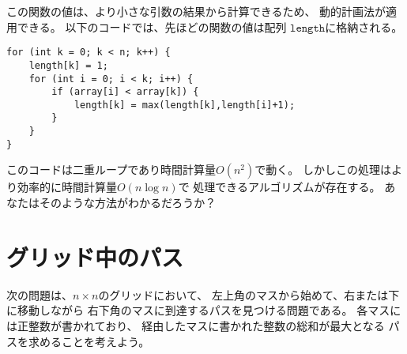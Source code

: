 \begin{comment}
Since all values of the function can be calculated
from its smaller values,
we can use dynamic programming.
In the following code, the values
of the function will be stored in an array
$\texttt{length}$.
\end{comment}

この関数の値は、より小さな引数の結果から計算できるため、
動的計画法が適用できる。
以下のコードでは、先ほどの関数の値は配列
$\texttt{length}$に格納される。

\begin{lstlisting}
for (int k = 0; k < n; k++) {
    length[k] = 1;
    for (int i = 0; i < k; i++) {
        if (array[i] < array[k]) {
            length[k] = max(length[k],length[i]+1);
        }
    }
}
\end{lstlisting}

\begin{comment}
This code works in $O(n^2)$ time,
because it consists of two nested loops.
However, it is also possible to implement
the dynamic programming calculation
more efficiently in $O(n \log n)$ time.
Can you find a way to do this?
\end{comment}

このコードは二重ループであり時間計算量$O(n^2)$で動く。
しかしこの処理はより効率的に時間計算量$O(n \log n)$で
処理できるアルゴリズムが存在する。
あなたはそのような方法がわかるだろうか？

\begin{comment}
\section{Paths in a grid}

Our next problem is to find a path
from the upper-left corner to
the lower-right corner
of an $n \times n$ grid, such that
we only move down and right.
Each square contains a positive integer,
and the path should be constructed so
that the sum of the values along
the path is as large as possible.
\end{comment}

\section{グリッド中のパス}

次の問題は、$n \times n$のグリッドにおいて、
左上角のマスから始めて、右または下に移動しながら
右下角のマスに到達するパスを見つける問題である。
各マスには正整数が書かれており、
経由したマスに書かれた整数の総和が最大となる
パスを求めることを考えよう。

